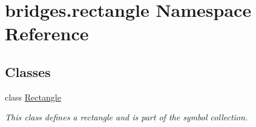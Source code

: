 \hypertarget{namespacebridges_1_1rectangle}{}\section{bridges.\+rectangle Namespace Reference}
\label{namespacebridges_1_1rectangle}
\subsection*{Classes}
\begin{DoxyCompactItemize}
\item 
class \hyperlink{classbridges_1_1rectangle_1_1_rectangle}{Rectangle}
\begin{DoxyCompactList}\small\item\em This class defines a rectangle and is part of the symbol collection. \end{DoxyCompactList}\end{DoxyCompactItemize}
